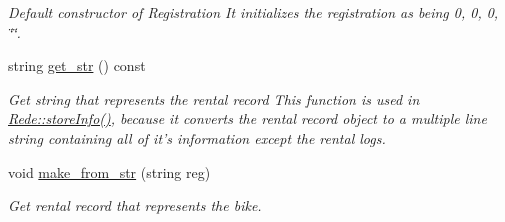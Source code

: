 \begin{DoxyCompactItemize}
\begin{DoxyCompactList}\small\item\em Default constructor of Registration It initializes the registration as being 0, 0, 0, \char`\"{}\char`\"{}. \end{DoxyCompactList}\item 
string \hyperlink{class_registo_ad0220e2d516af222c01893634eace4d4}{get\+\_\+str} () const 
\begin{DoxyCompactList}\small\item\em Get string that represents the rental record This function is used in \hyperlink{class_rede_abec1da6660663cd58e6851737219959e}{Rede\+::store\+Info()}, because it converts the rental record object to a multiple line string containing all of it's information except the rental logs. \end{DoxyCompactList}\item 
void \hyperlink{class_registo_aa377d8fc39a2efda5ae6452f618635c2}{make\+\_\+from\+\_\+str} (string reg)
\begin{DoxyCompactList}\small\item\em Get rental record that represents the bike. \end{DoxyCompactList}\end{DoxyCompactItemize}
